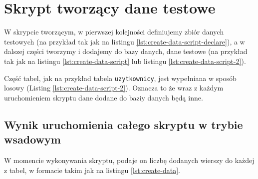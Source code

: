 \section{Skrypt tworzący dane testowe}

W skrypcie tworzącym, w pierwszej kolejności definiujemy zbiór danych testowych (na przykład tak jak na listingu \ref{lst:create-data-script-declare}), a w dalszej części tworzymy i dodajemy do bazy danych, dane testowe (na przykład tak jak na listingu \ref{lst:create-data-script} lub listingu \ref{lst:create-data-script-2}).

Część tabel, jak na przykład tabela \texttt{uzytkownicy}, jest wypełniana w sposób losowy (Listing \ref{lst:create-data-script-2}). Oznacza to że wraz z każdym uruchomieniem skryptu dane dodane do baziy danych będą inne.







\subsection{Wynik uruchomienia całego skryptu w trybie wsadowym}

W momencie wykonywania skryptu, podaje on liczbę dodanych wierszy do każdej z tabel, w formacie takim jak na listingu \ref{lst:create-data}.

